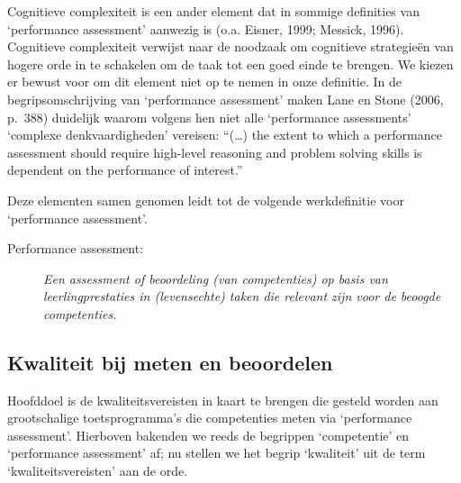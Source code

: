 \documentclass[
  letterpaper,
]{report}
\begin{document}
Cognitieve complexiteit is een ander element dat in sommige definities
van `performance assessment' aanwezig is (o.a. Eisner, 1999; Messick,
1996). Cognitieve complexiteit verwijst naar de noodzaak om cognitieve
strategieën van hogere orde in te schakelen om de taak tot een goed
einde te brengen. We kiezen er bewust voor om dit element niet op te
nemen in onze definitie. In de begripsomschrijving van `performance
assessment' maken Lane en Stone (2006, p.~388) duidelijk waarom volgens
hen niet alle `performance assessments' `complexe denkvaardigheden'
vereisen: ``(\ldots) the extent to which a performance assessment should
require high-level reasoning and problem solving skills is dependent on
the performance of interest.''

Deze elementen samen genomen leidt tot de volgende werkdefinitie voor
`performance assessment'.

\begin{description}
\item[Performance assessment:]
\emph{Een assessment of beoordeling (van competenties) op basis van
leerlingprestaties in (levensechte) taken die relevant zijn voor de
beoogde competenties.}
\end{description}

\hypertarget{kwaliteit-bij-meten-en-beoordelen}{%
\subsection{Kwaliteit bij meten en
beoordelen}\label{kwaliteit-bij-meten-en-beoordelen}}

Hoofddoel is de kwaliteitsvereisten in kaart te brengen die gesteld
worden aan grootschalige toetsprogramma's die competenties meten via
`performance assessment'. Hierboven bakenden we reeds de begrippen
`competentie' en `performance assessment' af; nu stellen we het begrip
`kwaliteit' uit de term `kwaliteitsvereisten' aan de orde.
\end{document}

